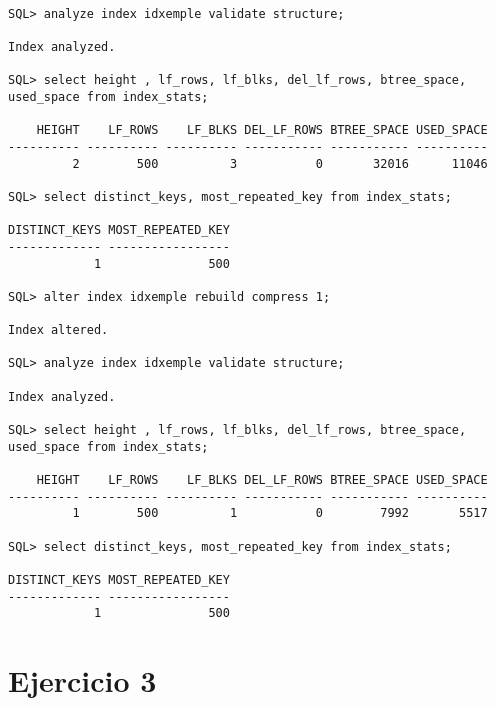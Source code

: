 \documentclass[11pt,a4paper,titlepage,leqno]{article}
\newcommand{\ejercicio}[1]{
    \section*{Ejercicio #1}
    \setcounter{answer}{0}
}
\newcounter{answer}
\begin{document}
\begin{verbatim}

SQL> analyze index idxemple validate structure;

Index analyzed.

SQL> select height , lf_rows, lf_blks, del_lf_rows, btree_space, used_space from index_stats;

    HEIGHT    LF_ROWS    LF_BLKS DEL_LF_ROWS BTREE_SPACE USED_SPACE
---------- ---------- ---------- ----------- ----------- ----------
         2        500          3           0       32016      11046

SQL> select distinct_keys, most_repeated_key from index_stats;

DISTINCT_KEYS MOST_REPEATED_KEY
------------- -----------------
            1               500

SQL> alter index idxemple rebuild compress 1;

Index altered.

SQL> analyze index idxemple validate structure;

Index analyzed.

SQL> select height , lf_rows, lf_blks, del_lf_rows, btree_space, used_space from index_stats;

    HEIGHT    LF_ROWS    LF_BLKS DEL_LF_ROWS BTREE_SPACE USED_SPACE
---------- ---------- ---------- ----------- ----------- ----------
         1        500          1           0        7992       5517

SQL> select distinct_keys, most_repeated_key from index_stats;

DISTINCT_KEYS MOST_REPEATED_KEY
------------- -----------------
            1               500

\end{verbatim}

\ejercicio{3}
\end{document}
